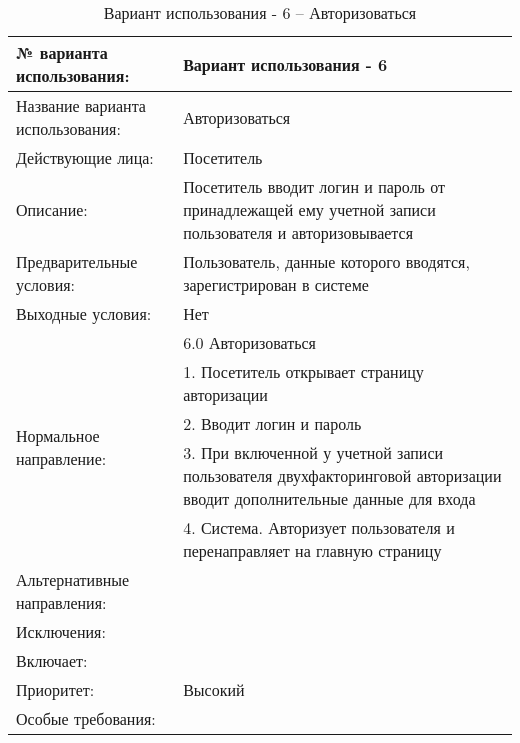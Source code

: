 \begin{table}[H]
  \caption{\onehalfspacing Вариант использования - 6 – Авторизоваться}\label{use-case-6-table}
  \begin{tabular}{|p{6cm}|p{10cm}|}
  \hline № варианта использования: & Вариант использования - 6 \\
  \hline Название варианта использования: & Авторизоваться \\
  \hline Действующие лица: & Посетитель \\
  \hline Описание: & Посетитель вводит логин и пароль от принадлежащей ему учетной записи пользователя и авторизовывается \\
  \hline Предварительные условия: & Пользователь, данные которого вводятся, зарегистрирован в системе \\
  \hline Выходные условия: & Нет \\
  \hline \multirow{5}{*}{Нормальное направление:} & 6.0 Авторизоваться \\
  \cline{2-2} & 1. Посетитель открывает страницу авторизации \\
  \cline{2-2} & 2. Вводит логин и пароль \\
  \cline{2-2} & 3. При включенной у учетной записи пользователя двухфакторинговой авторизации вводит дополнительные данные для входа \\
  \cline{2-2} & 4. Система. Авторизует пользователя и перенаправляет на главную страницу \\
  \hline Альтернативные направления: &  \\
  \hline Исключения: &  \\
  \hline Включает: &  \\
  \hline Приоритет: & Высокий \\
  \hline Особые требования: &  \\
  \hline
  \end{tabular}
\end{table}

